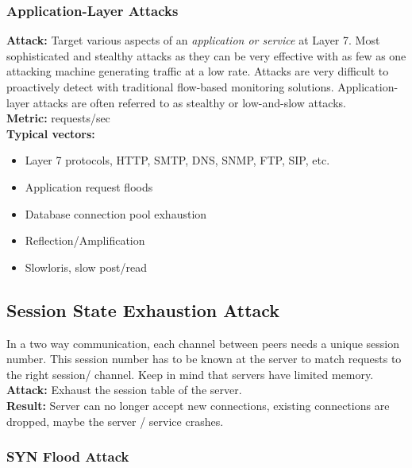 \documentclass[11pt,oneside,a4paper]{article}
\begin{document}
\subsubsection{Application-Layer Attacks}

\textbf{Attack:} Target various aspects of an \textit{application or service} at Layer 7. Most sophisticated and stealthy attacks as they can be very effective with as few as one attacking machine generating traffic at a low rate. Attacks are very difficult to proactively detect with traditional flow-based monitoring solutions. Application-layer attacks are often referred to as stealthy or low-and-slow attacks.\\
\textbf{Metric:} requests/sec\\
\textbf{Typical vectors:}
\vspace{-\topsep}
\begin{itemize}
	\setlength{\itemsep}{0pt}
	\setlength{\parskip}{0pt}
	\item Layer 7 protocols, HTTP, SMTP, DNS, SNMP, FTP, SIP, etc.
	\item Application request floods
	\item Database connection pool exhaustion
	\item Reflection/Amplification
	\item Slowloris, slow post/read
\end{itemize}
\vspace{-\topsep}

\subsection{Session State Exhaustion Attack}

In a two way communication, each channel between peers needs a unique session number. This session number has to be known at the server to match requests to the right session/ channel. Keep in mind that servers have limited memory.\\
\noindent\textbf{Attack:} Exhaust the session table of the server.\\
\textbf{Result:} Server can no longer accept new connections, existing connections are dropped, maybe the server / service crashes.

\subsubsection{SYN Flood Attack}
\end{document}
